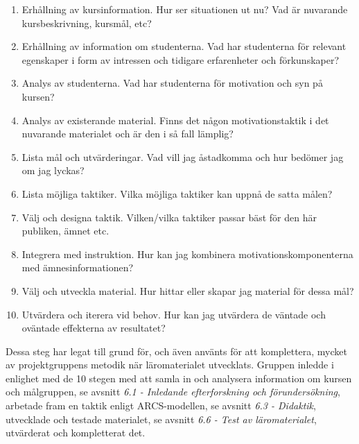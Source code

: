\documentclass[]{article}
\begin{document}
\begin{enumerate}
\item Erhållning av kursinformation. Hur ser situationen ut nu? Vad är
 nuvarande kursbeskrivning, kursmål, etc?

\item Erhållning av information om studenterna. Vad har studenterna
 för relevant egenskaper i form av intressen och tidigare
 erfarenheter och förkunskaper?

\item Analys av studenterna. Vad har studenterna för motivation och
 syn på kursen?

\item Analys av existerande material. Finns det någon
 motivationstaktik i det nuvarande materialet och är den i så fall
 lämplig?

\item Lista mål och utvärderingar. Vad vill jag åstadkomma och hur
 bedömer jag om jag lyckas?

\item Lista möjliga taktiker. Vilka möjliga taktiker kan uppnå de
 satta målen?

\item Välj och designa taktik. Vilken/vilka taktiker passar bäst för
 den här publiken, ämnet etc.

\item Integrera med instruktion. Hur kan jag kombinera
 motivationskomponenterna med ämnesinformationen?

\item Välj och utveckla material. Hur hittar eller skapar jag material
 för dessa mål?

\item Utvärdera och iterera vid behov. Hur kan jag utvärdera de
 väntade och oväntade effekterna av resultatet?

\end{enumerate}

Dessa steg har legat till grund för, och även använts för att
komplettera, mycket av projektgruppens metodik när läromaterialet
utvecklats. Gruppen inledde i enlighet med de 10 stegen med att samla
in och analysera information om kursen och målgruppen, se avsnitt
\textit{6.1 - Inledande efterforskning och förundersökning},
arbetade fram en taktik enligt ARCS-modellen, se avsnitt \textit{6.3
- Didaktik}, utvecklade och testade materialet, se avsnitt \textit{6.6
- Test av läromaterialet}, utvärderat och kompletterat det.
\end{document}

